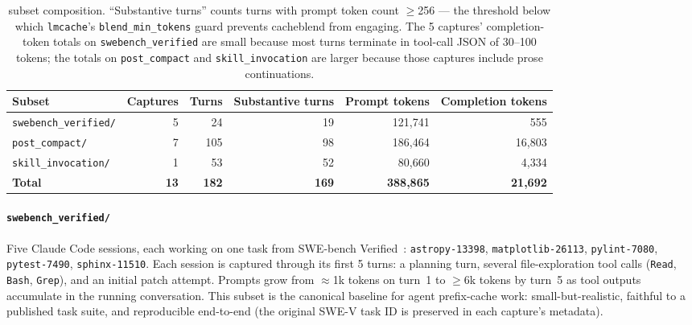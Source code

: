 \begin{table}[t]
\small
\centering
\begin{tabular}{lrrrrr}
\toprule
Subset & Captures & Turns & Substantive turns & Prompt tokens & Completion tokens \\
\midrule
\texttt{swebench\_verified/} & 5 & 24 & 19 & 121{,}741 & 555 \\
\texttt{post\_compact/} & 7 & 105 & 98 & 186{,}464 & 16{,}803 \\
\texttt{skill\_invocation/} & 1 & 53 & 52 & 80{,}660 & 4{,}334 \\
\midrule
\textbf{Total} & \textbf{13} & \textbf{182} & \textbf{169} & \textbf{388{,}865} & \textbf{21{,}692} \\
\bottomrule
\end{tabular}
\caption{\dataset{} subset composition. ``Substantive turns'' counts turns with
prompt token count $\geq$256 --- the threshold below which
\texttt{lmcache}'s \texttt{blend\_min\_tokens} guard prevents cacheblend
from engaging. The 5 captures' completion-token totals on
\texttt{swebench\_verified} are small because most turns terminate in
tool-call JSON of 30--100 tokens; the totals on \texttt{post\_compact}
and \texttt{skill\_invocation} are larger because those captures include
prose continuations.}
\label{tab:dataset-summary}
\end{table}

\paragraph{\texttt{swebench\_verified/}} Five Claude Code sessions, each
working on one task from SWE-bench Verified~\cite{swe-bench-verified}:
\texttt{astropy-13398}, \texttt{matplotlib-26113}, \texttt{pylint-7080},
\texttt{pytest-7490}, \texttt{sphinx-11510}. Each session is captured
through its first 5 turns: a planning turn, several file-exploration
tool calls (\texttt{Read}, \texttt{Bash}, \texttt{Grep}), and an initial
patch attempt. Prompts grow from $\approx$1k tokens on turn~1 to
$\geq$6k tokens by turn~5 as tool outputs accumulate in the running
conversation. This subset is the canonical baseline for agent
prefix-cache work: small-but-realistic, faithful to a published task
suite, and reproducible end-to-end (the original SWE-V task ID is
preserved in each capture's metadata).

